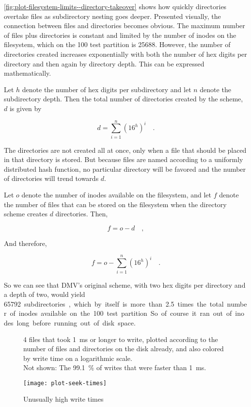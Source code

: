 \autoref{fig:plot-filesystem-limits--directory-takeover} shows how quickly
directories overtake files as subdirectory nesting goes deeper. Presented
visually, the connection between files and directories becomes obvious. The
maximum number of files plus directories is constant and limited by the number
of \glspl{inode} on the filesystem, which on the \SI{100}{\mib} test partition
is \num{25688}. However, the number of directories created increases
exponentially with both the number of hex digits per directory and then again by
directory depth. This can be expressed mathematically.

Let $h$ denote the number of hex digits per subdirectory and let $n$ denote the
subdirectory depth. Then the total number of directories created by the scheme,
$d$ is given by

\begin{equation}
    d = \sum_{i=1}^n \left( 16^h \right)^i \quad.
\end{equation}

The directories are not created all at once, only when a file that should be
placed in that directory is stored. But because files are named according to a
uniformly distributed hash function, no particular directory will be favored and
the number of directories will trend towards $d$.

Let $o$ denote the number of \glspl{inode} available on the filesystem, and let
$f$ denote the number of files that can be stored on the filesystem when the
directory scheme creates $d$ directories. Then,

\begin{equation}
    f = o-d \quad,
\end{equation}

And therefore,

\begin{equation}
    f = o - \sum_{i=1}^n \left( 16^h \right)^i \quad.
\end{equation}

So we can see that \gls{DMV}'s original scheme, with two hex digits per
directory and a depth of two, would yield \SI{65792} subdirectories, which by
itself is more than \num{2.5} times the total number of \glspl{inode} available
on the \SI{100}{\mib} test partition. So of course it ran out of \glspl{inode}
long before running out of disk space.


\begin{figure}[p]
    \caption{Unusually high write times}
    \label{plot-seek-times}
    \centering

    \SI{4}{\kib} files that took \SI{1}{\ms} or longer to write, plotted
    according to the number of files and directories on the disk already, and
    also colored by write time on a logarithmic scale. \\
    Not shown: The \SI{99.1}{\percent} of writes that were faster than
    \SI{1}{\ms}.

    \texttt{[image: plot-seek-times]}
\end{figure}

